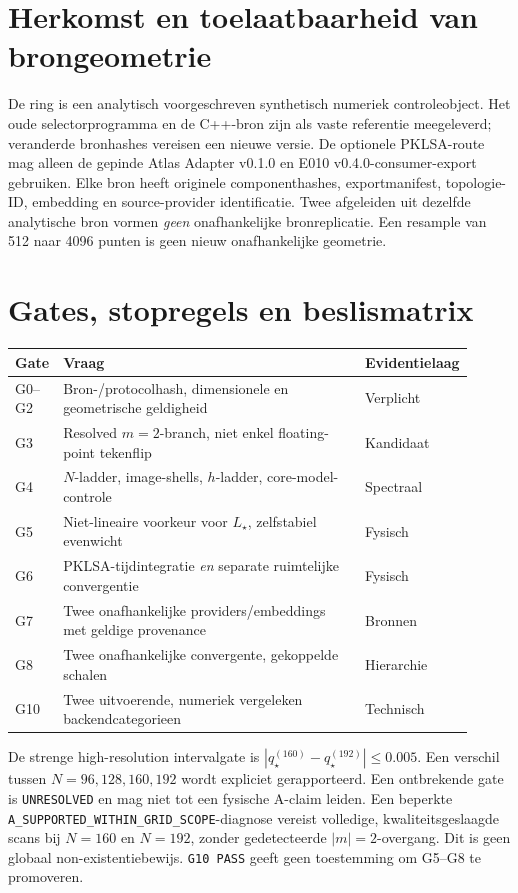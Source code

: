 \documentclass[11pt,a4paper]{article}
\begin{document}
\section{Herkomst en toelaatbaarheid van brongeometrie}
De ring is een analytisch voorgeschreven synthetisch numeriek controleobject. Het oude selectorprogramma en de C++-bron zijn als vaste referentie meegeleverd; veranderde bronhashes vereisen een nieuwe versie. De optionele PKLSA-route mag alleen de gepinde Atlas Adapter v0.1.0 en E010 v0.4.0-consumer-export gebruiken. Elke bron heeft originele componenthashes, exportmanifest, topologie-ID, embedding en source-provider identificatie. Twee afgeleiden uit dezelfde analytische bron vormen \emph{geen} onafhankelijke bronreplicatie. Een resample van 512 naar 4096 punten is geen nieuw onafhankelijke geometrie.

\section{Gates, stopregels en beslismatrix}
\begin{longtable}{p{0.09\linewidth}p{0.67\linewidth}p{0.15\linewidth}}\toprule
Gate & Vraag & Evidentielaag \\ \midrule
G0--G2 & Bron-/protocolhash, dimensionele en geometrische geldigheid & Verplicht \\
G3 & Resolved $m=2$-branch, niet enkel floating-point tekenflip & Kandidaat \\
G4 & $N$-ladder, image-shells, $h$-ladder, core-model-controle & Spectraal \\
G5 & Niet-lineaire voorkeur voor $L_\star$, zelfstabiel evenwicht & Fysisch \\
G6 & PKLSA-tijdintegratie \emph{en} separate ruimtelijke convergentie & Fysisch \\
G7 & Twee onafhankelijke providers/embeddings met geldige provenance & Bronnen \\
G8 & Twee onafhankelijke convergente, gekoppelde schalen & Hierarchie \\
G10 & Twee uitvoerende, numeriek vergeleken backendcategorieen & Technisch \\ \bottomrule\end{longtable}
De strenge high-resolution intervalgate is $|q^{(160)}_\star-q^{(192)}_\star|\le0.005$. Een verschil tussen $N=96,128,160,192$ wordt expliciet gerapporteerd. Een ontbrekende gate is \texttt{UNRESOLVED} en mag niet tot een fysische A-claim leiden. Een beperkte \texttt{A\_SUPPORTED\_WITHIN\_GRID\_SCOPE}-diagnose vereist volledige, kwaliteitsgeslaagde scans bij $N=160$ en $N=192$, zonder gedetecteerde $|m|=2$-overgang. Dit is geen globaal non-existentiebewijs. \texttt{G10 PASS} geeft geen toestemming om G5--G8 te promoveren.
\end{document}
